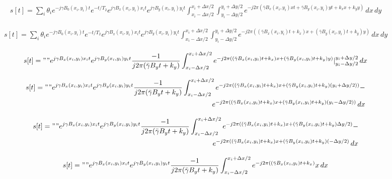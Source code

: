 \documentclass{article}
\begin{document}
\begin{align*}
    s[t] = \sum_i \theta_i e^{-j \gamma B_0(x_i, y_i) t} e^{-t/T_2} e^{j \gamma B_x(x_i,y_i) x_i t } e^{j \gamma B_y(x_i,y_i) y_i t} \int_{x_i - \Delta x/2}^{x_i + \Delta x/2} \int_{y_i - \Delta y/2}^{y_i + \Delta y/2} e^{-j 2 \pi (\bar\gamma B_x(x_i,y_i) x t + \bar\gamma B_y(x_i,y_i) y t + k_x x + k_y y)} \, dx \, dy
\end{align*}

\begin{align*}
    s[t] = \sum_i \theta_i e^{-j \gamma B_0(x_i, y_i) t} e^{-t/T_2} e^{j \gamma B_x(x_i,y_i) x_i t } e^{j \gamma B_y(x_i,y_i) y_i t} \int_{x_i - \Delta x/2}^{x_i + \Delta x/2} \int_{y_i - \Delta y/2}^{y_i + \Delta y/2} e^{-j 2 \pi ((\bar\gamma B_x(x_i,y_i) t + k_x) x  + (\bar\gamma B_y(x_i,y_i) t + k_y) y)} \, dx \, dy
\end{align*}

\begin{align*}
    s[t] = "" e^{j \gamma B_x(x_i,y_i) x_i t } e^{j \gamma B_y(x_i,y_i) y_i t} \frac{-1}{j2\pi (\bar\gamma B_y t + k_y)} \int_{x_i - \Delta x/2}^{x_i + \Delta x/2} e^{-j 2 \pi ((\bar\gamma B_x(x_i,y_i) t + k_x) x  + (\bar\gamma B_y(x_i,y_i) t + k_y) y)} \rvert_{y_i - \Delta y/2}^{y_i + \Delta y/2} \, dx
\end{align*}

\begin{align*}
    s[t] = "" e^{j \gamma B_x(x_i,y_i) x_i t } e^{j \gamma B_y(x_i,y_i) y_i t} \frac{-1}{j2\pi (\bar\gamma B_y t + k_y)} \int_{x_i - \Delta x/2}^{x_i + \Delta x/2} e^{-j 2 \pi ((\bar\gamma B_x(x_i,y_i) t + k_x) x  + (\bar\gamma B_y(x_i,y_i) t + k_y) (y_i + \Delta y/2))} - \\
    e^{-j 2 \pi ((\bar\gamma B_x(x_i,y_i) t + k_x) x  + (\bar\gamma B_y(x_i,y_i) t + k_y) (y_i - \Delta y/2))} \, dx
\end{align*}

\begin{align*}
    s[t] = "" e^{j \gamma B_x(x_i,y_i) x_i t } e^{j \gamma B_y(x_i,y_i) y_i t} \frac{-1}{j2\pi (\bar\gamma B_y t + k_y)} \int_{x_i - \Delta x/2}^{x_i + \Delta x/2} e^{-j 2 \pi ((\bar\gamma B_x(x_i,y_i) t + k_x) x  + (\bar\gamma B_y(x_i,y_i) t + k_y) \Delta y/2)} - \\
    e^{-j 2 \pi ((\bar\gamma B_x(x_i,y_i) t + k_x) x  + (\bar\gamma B_y(x_i,y_i) t + k_y) (-\Delta y/2)} \, dx
\end{align*}

\begin{align*}
    s[t] = "" e^{j \gamma B_x(x_i,y_i) x_i t } e^{j \gamma B_y(x_i,y_i) y_i t} \frac{-1}{j2\pi (\bar\gamma B_y t + k_y)} \int_{x_i - \Delta x/2}^{x_i + \Delta x/2} e^{-j 2 \pi ((\bar\gamma B_x(x_i,y_i) t + k_x)} x \, dx
\end{align*}
\end{document}
